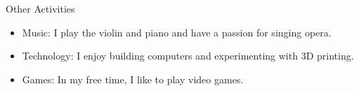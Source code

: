 \documentclass{resume} %
\begin{document}
\begin{rSection}{Other Activities} 
\begin{itemize}
    \item Music: I play the violin and piano and have a passion for singing opera.
    \item Technology: I enjoy building computers and experimenting with 3D printing.
    \item Games: In my free time, I like to play video games.
\end{itemize}


\end{rSection}

\end{document}
